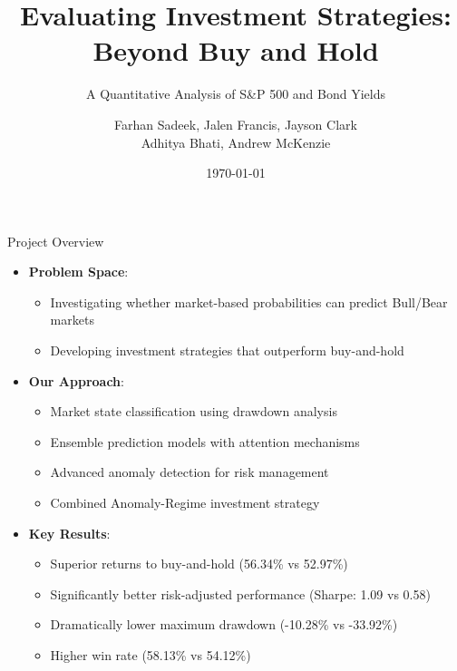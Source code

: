 \documentclass[aspectratio=169,xcolor=dvipsnames]{beamer}
\title{Evaluating Investment Strategies: Beyond Buy and Hold}
\subtitle{A Quantitative Analysis of S\&P 500 and Bond Yields}
\author{Farhan Sadeek, Jalen Francis, Jayson Clark \texorpdfstring{\\}{,} Adhitya Bhati, Andrew McKenzie}
\institute
{
    Department of Mathematics \\
    The Ohio State University %
}
\date{\today} %
\begin{document}
\begin{frame}
	\titlepage
\end{frame}

\begin{frame}{Project Overview}
	\begin{itemize}
		\item \textbf{Problem Space}:
		      \begin{itemize}
			      \item Investigating whether market-based probabilities can predict Bull/Bear markets
			      \item Developing investment strategies that outperform buy-and-hold
		      \end{itemize}
		\item \textbf{Our Approach}:
		      \begin{itemize}
			      \item Market state classification using drawdown analysis
			      \item Ensemble prediction models with attention mechanisms
			      \item Advanced anomaly detection for risk management
			      \item Combined Anomaly-Regime investment strategy
		      \end{itemize}
		\item \textbf{Key Results}:
		      \begin{itemize}
			      \item Superior returns to buy-and-hold (56.34\% vs 52.97\%)
			      \item Significantly better risk-adjusted performance (Sharpe: 1.09 vs 0.58)
			      \item Dramatically lower maximum drawdown (-10.28\% vs -33.92\%)
			      \item Higher win rate (58.13\% vs 54.12\%)
		      \end{itemize}
	\end{itemize}
\end{frame}
\end{document}
